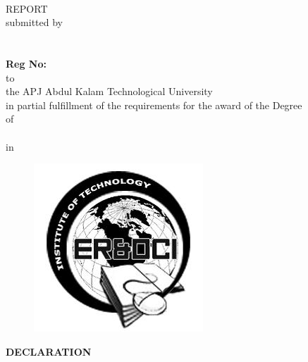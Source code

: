 \documentclass[12pt,a4paper]{report}
\begin{document}
\thispagestyle{empty}
\begin{center}
{\Large{\textbf{\projectnameb{}}}}
\vspace{5mm}
\\ \MakeUppercase{\reportTitle{} report}
\vspace{5mm}
\\submitted by
\\\stud{}
\vspace{5mm}
\\ \dept{} 
\\{\textbf{Reg No:\roll{}}}
\vspace{5mm}
\\to
\\the APJ Abdul Kalam Technological University
\\in partial fulfillment of the requirements for the award of the Degree
\\of
\\ \degree{}
\\in
\\ \stream{}
\end{center}

\begin{figure}[ht]
\centering
\includegraphics[scale=0.5]{logo}
\end{figure}

\begin{center}
{\dept{}
\vspace{5mm}
\insti{}}
\end{center}

\newpage
\thispagestyle{empty}

\begin{center}
\textbf{DECLARATION}
\end{center}
\end{document}
